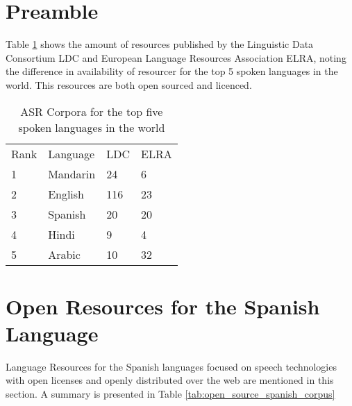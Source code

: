 \documentclass[10pt, a4paper]{article}
\begin{document}

\section{Preamble}
Table \ref{tab:resources_by_langauge} shows the amount of resources published by the Linguistic Data Consortium LDC and European Language Resources Association ELRA, noting the difference in availability of resourcer for the top 5 spoken languages in the world. This resources are both open sourced and licenced.


\begin{table}[h]
\caption{ASR Corpora for the top five spoken languages in the world \cite{HernndezMena2017}}
\label{tab:resources_by_langauge}
\begin{tabular}{llll}
Rank & Language & LDC & ELRA \\
1    & Mandarin & 24  & 6    \\
2    & English  & 116 & 23   \\
3    & Spanish  & 20  & 20   \\
4    & Hindi    & 9   & 4    \\
5    & Arabic   & 10  & 32  
\end{tabular}
\end{table}

\section{Open Resources for the Spanish Language}

Language Resources for the Spanish languages focused on speech technologies with open licenses and openly distributed over the web are mentioned in this section. A summary is presented in Table \ref{tab:open_source_spanish_corpus}
\end{document}
